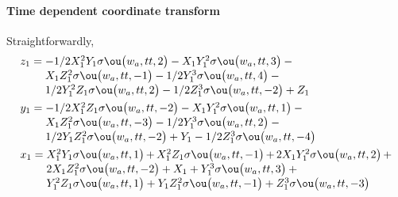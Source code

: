 \paragraph{Time dependent coordinate transform}  Straightforwardly,
\begin{align*}&
z_{1}=\ParMath{ -1/2 X_{1}^{2} Y_{1} \sigma  \ou\big(w_{a},tt,2\big)-X_{1} Y_{1}^{
2} \sigma  \ou\big(w_{a},tt,3\big)-X_{1} Z_{1}^{2} \sigma  \ou\big(w_{a}
,tt,-1\big)-1/2 Y_{1}^{3} \sigma  \ou\big(w_{a},tt,4\big)-1/2 Y_{1}^{2} 
Z_{1} \sigma  \ou\big(w_{a},tt,2\big)-1/2 Z_{1}^{3} \sigma  \ou\big(w_{a
},tt,-2\big)+Z_{1}
}\\&
y_{1}=\ParMath{ -1/2 X_{1}^{2} Z_{1} \sigma  \ou\big(w_{a},tt,-2\big)-X_{1} Y_{1}
^{2} \sigma  \ou\big(w_{a},tt,1\big)-X_{1} Z_{1}^{2} \sigma  \ou\big(w_{
a},tt,-3\big)-1/2 Y_{1}^{3} \sigma  \ou\big(w_{a},tt,2\big)-1/2 Y_{1} Z_
{1}^{2} \sigma  \ou\big(w_{a},tt,-2\big)+Y_{1}-1/2 Z_{1}^{3} \sigma  \ou
\big(w_{a},tt,-4\big)
}\\&
x_{1}=\ParMath{ X_{1}^{2} Y_{1} \sigma  \ou\big(w_{a},tt,1\big)+X_{1}^{2} Z_{1} 
\sigma  \ou\big(w_{a},tt,-1\big)+2 X_{1} Y_{1}^{2} \sigma  \ou\big(w_{a}
,tt,2\big)+2 X_{1} Z_{1}^{2} \sigma  \ou\big(w_{a},tt,-2\big)+X_{1}+Y_{1
}^{3} \sigma  \ou\big(w_{a},tt,3\big)+Y_{1}^{2} Z_{1} \sigma  \ou\big(w_
{a},tt,1\big)+Y_{1} Z_{1}^{2} \sigma  \ou\big(w_{a},tt,-1\big)+Z_{1}^{3}
 \sigma  \ou\big(w_{a},tt,-3\big)
}
\end{align*}

